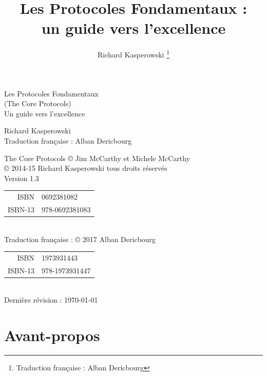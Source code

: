 \documentclass[paper=6in:9in,pagesize=pdftex,headinclude=on,footinclude=on,12pt]{scrbook}
\author{Richard Kasperowski \thanks{Traduction française : Alban Dericbourg}}
\title{Les Protocoles Fondamentaux :\\un guide vers l'excellence}
\date{}
\begin{document}
\frontmatter

\begin{titlepage}
	\sffamily
	\centering

	\vspace*{\fill}

	{\Huge Les Protocoles Fondamentaux\\[-.25em]
	{\LARGE (The Core Protocols)}\\[1em]}
	{\huge Un guide vers l'excellence}

	\vspace*{\fill}
	\vspace*{\fill}

	{\huge Richard Kasperowski}\\[2em]
	Traduction française : Alban Dericbourg\par

	\vspace*{\fill}
\end{titlepage}

\vspace*{\fill}
\begin{center}
	The Core Protocols © Jim McCarthy et Michele McCarthy \\[1em]

	\copyright{} 2014-15 Richard Kasperowski tous droits réservés\\
	Version 1.3\\
	\begin{tabular}{rl}
		ISBN & 0692381082 \\
		ISBN-13 & 978-0692381083\\
	\end{tabular}\\[1em]

	Traduction française : \copyright{} 2017 Alban Dericbourg\\
	\begin{tabular}{rl}
		ISBN & 1973931443 \\
		ISBN-13 & 978-1973931447\\
	\end{tabular}\\[1em]
	Dernière révision : \today
\end{center}
\pagebreak

\setcounter{secnumdepth}{1}
\setcounter{tocdepth}{1}
\tableofcontents

\setlength{\parskip}{0.5em}

\chapter{Avant-propos}
\end{document}

